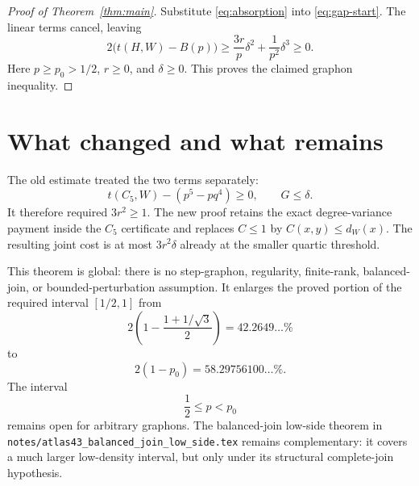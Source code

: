 \documentclass[11pt]{article}
\theoremstyle{remark}
\begin{document}
\begin{proof}[Proof of Theorem~\ref{thm:main}]
Substitute \eqref{eq:absorption} into \eqref{eq:gap-start}.  The linear
terms cancel, leaving
\[
 2\bigl(t(H,W)-B(p)\bigr)
 \geq
 \frac{3r}{p}\delta^2+\frac1{p^2}\delta^3\geq0.
\]
Here $p\geq p_0>1/2$, $r\geq0$, and $\delta\geq0$.  This proves the
claimed graphon inequality.
\end{proof}

\section{What changed and what remains}

The old estimate treated the two terms separately:
\[
 t(C_5,W)-(p^5-pq^4)\geq0,
 \qquad G\leq\delta.
\]
It therefore required $3r^2\geq1$.  The new proof retains the exact
degree-variance payment inside the $C_5$ certificate and replaces
$C\leq1$ by $C(x,y)\leq d_W(x)$.  The resulting joint cost is at most
$3r^2\delta$ already at the smaller quartic threshold.

This theorem is global: there is no step-graphon, regularity, finite-rank,
balanced-join, or bounded-perturbation assumption.  It enlarges the proved
portion of the required interval $[1/2,1]$ from
\[
 2\left(1-\frac{1+1/\sqrt3}{2}\right)
 =42.2649\ldots\%
\]
to
\[
 2(1-p_0)=58.29756100\ldots\%.
\]
The interval
\[
 \frac12\leq p<p_0
\]
remains open for arbitrary graphons.  The balanced-join low-side theorem in
\texttt{notes/atlas43\_balanced\_join\_low\_side.tex} remains complementary:
it covers a much larger low-density interval, but only under its structural
complete-join hypothesis.
\end{document}
